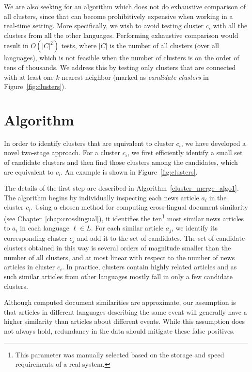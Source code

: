 We are also seeking for an algorithm which does not do exhaustive comparison of all clusters,
since that can become prohibitively expensive when working in a real-time setting. More specifically,
we wish to avoid testing cluster $c_i$ with all the clusters from all the other languages.
Performing exhaustive comparison would result in $O(|C|^2)$ tests, where $|C|$ is the number of all
clusters (over all languages), which is not feasible when the number of clusters is on the order of tens
of thousands. We address this by testing only clusters that are connected with at least one $k$-nearest
neighbor (marked as \emph{candidate clusters} in Figure~\ref{fig:clusters}).

\section{Algorithm}\label{algo:features}

In order to identify clusters that are equivalent to cluster $c_i$, we have developed
a novel two-stage approach. For a cluster $c_i$, we first efficiently identify a small set of
candidate clusters and then find those clusters among the candidates, which are
equivalent to $c_i$. An example is  shown in  Figure~\ref{fig:clusters}.

The details of the first step are described in Algorithm~\ref{cluster_merge_algo1}. The algorithm
begins by individually inspecting each news article $a_i$ in the cluster $c_i$. Using a chosen
method for computing cross-lingual document similarity (see Chapter~\ref{chap:crosslingual}), it identifies
the ten\footnote{This parameter was manually selected based on the storage and speed requirements of a real system.}
most similar news articles to $a_i$ in each language $\ell \in L$. For each similar
article $a_j$, we identify its corresponding  cluster $c_j$ and add it to the set of candidates.
The set of candidate clusters obtained in this way is several orders of magnitude smaller than the
number of all clusters, and at most linear with respect to the number of news articles in
cluster $c_i$. In practice, clusters contain highly related articles and as such similar
articles from other languages mostly fall in only a few candidate clusters.

Although computed document similarities are approximate, our  assumption is that articles
in different languages describing the same event will generally have a higher similarity
than articles about different events. While this assumption does not always hold, redundancy
in the data should mitigate these false positives.

